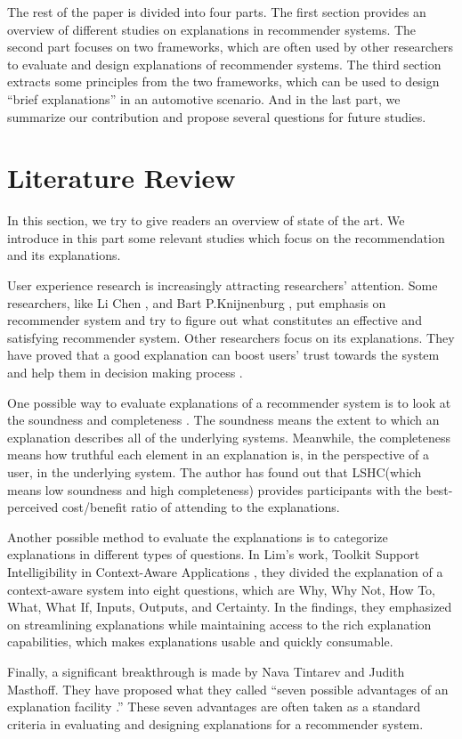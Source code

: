   \indent The rest of the paper is divided into four parts. The first section provides an overview of different studies on explanations in recommender systems. The second part focuses on two frameworks, which are often used by other researchers to evaluate and design explanations of recommender systems. The third section extracts some principles from the two frameworks, which can be used to design ``brief explanations'' in an automotive scenario. And in the last part, we summarize our contribution and propose several questions for future studies.

\section{Literature Review}

    \indent In this section, we try to give readers an overview of state of the art. We introduce in this part some relevant studies which focus on the recommendation and its explanations.

    \indent User experience research is increasingly attracting researchers’ attention. Some researchers, like Li Chen \cite{pu2011user}, and Bart P.Knijnenburg \cite{knijnenburg2012explaining}, put emphasis on recommender system and try to figure out what constitutes an effective and satisfying recommender system. Other researchers focus on its explanations. They have proved that a good explanation can boost users' trust towards the system and help them in decision making process \cite{tintarev2007survey} \cite{van2004designing} \cite{pu2007trust}.
    
    \indent One possible way to evaluate explanations of a recommender system is to look at the soundness and completeness \cite{kulesza2013too}. The soundness means the extent to which an explanation describes all of the underlying systems. Meanwhile, the completeness means how truthful each element in an explanation is, in the perspective of a user, in the underlying system. The author has found out that LSHC(which means low soundness and high completeness) provides participants with the best-perceived cost/benefit ratio of attending to the explanations. 

    \indent Another possible method to evaluate the explanations is to categorize explanations in different types of questions. In Lim's work, Toolkit Support Intelligibility in Context-Aware Applications \cite{lim2010toolkit}, they divided the explanation of a context-aware system into eight questions, which are Why, Why Not, How To, What, What If, Inputs, Outputs, and Certainty. In the findings, they emphasized on streamlining explanations while maintaining access to the rich explanation capabilities, which makes explanations usable and quickly consumable.    
    
    \indent Finally, a significant breakthrough is made by Nava Tintarev and Judith Masthoff. They have proposed what they called ``seven possible advantages of an explanation facility \cite{tintarev2007survey}.'' These seven advantages are often taken as a standard criteria in evaluating and designing explanations for a recommender system.